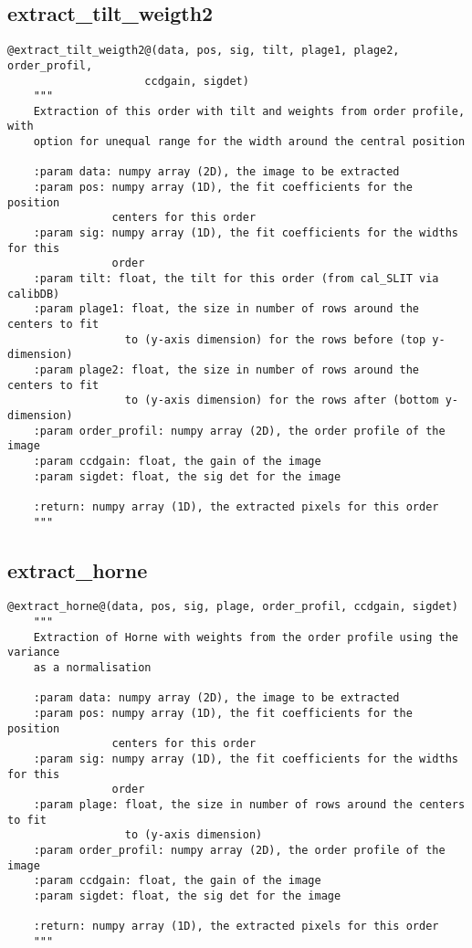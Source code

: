 \subsection{extract\_tilt\_weigth2}
\begin{lstlisting}[style=pythonstyle]
@extract_tilt_weigth2@(data, pos, sig, tilt, plage1, plage2, order_profil,
                     ccdgain, sigdet)
    """
    Extraction of this order with tilt and weights from order profile, with 
    option for unequal range for the width around the central position

    :param data: numpy array (2D), the image to be extracted
    :param pos: numpy array (1D), the fit coefficients for the position
                centers for this order
    :param sig: numpy array (1D), the fit coefficients for the widths for this
                order
    :param tilt: float, the tilt for this order (from cal_SLIT via calibDB)
    :param plage1: float, the size in number of rows around the centers to fit
                  to (y-axis dimension) for the rows before (top y-dimension)
    :param plage2: float, the size in number of rows around the centers to fit
                  to (y-axis dimension) for the rows after (bottom y-dimension)
    :param order_profil: numpy array (2D), the order profile of the image
    :param ccdgain: float, the gain of the image
    :param sigdet: float, the sig det for the image

    :return: numpy array (1D), the extracted pixels for this order
    """
\end{lstlisting}

\subsection{extract\_horne}
\begin{lstlisting}[style=pythonstyle]
@extract_horne@(data, pos, sig, plage, order_profil, ccdgain, sigdet)
    """
    Extraction of Horne with weights from the order profile using the variance
    as a normalisation

    :param data: numpy array (2D), the image to be extracted
    :param pos: numpy array (1D), the fit coefficients for the position
                centers for this order
    :param sig: numpy array (1D), the fit coefficients for the widths for this
                order
    :param plage: float, the size in number of rows around the centers to fit
                  to (y-axis dimension)
    :param order_profil: numpy array (2D), the order profile of the image
    :param ccdgain: float, the gain of the image
    :param sigdet: float, the sig det for the image

    :return: numpy array (1D), the extracted pixels for this order
    """

\end{lstlisting}

